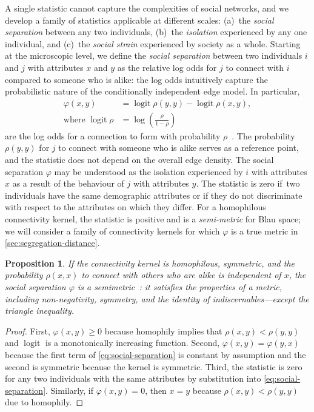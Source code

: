 \documentclass{scrartcl}
\DeclareMathOperator{\logit}{logit}
\newtheorem{prop}{Proposition}
\begin{document}
\begin{refsection}
A single statistic cannot capture the complexities of social networks, and we develop a family of statistics applicable at different scales: (a)~the \emph{social separation} between any two individuals, (b)~the \emph{isolation} experienced by any one individual, and (c)~the \emph{social strain} experienced by society as a whole. Starting at the microscopic level, we define the \emph{social separation} between two individuals $i$ and $j$ with attributes $x$ and $y$ as the relative log odds for $j$ to connect with $i$ compared to someone who is alike: the log odds intuitively capture the probabilistic nature of the conditionally independent edge model. In particular,
\begin{align}
    \varphi(x, y) &= \logit \rho(y,y) - \logit\rho(x,y),\label{eq:social-separation}\\
    \text{where }\logit\rho &= \log\left(\frac{\rho}{1-\rho}\right)\nonumber
\end{align}
are the log odds for a connection to form with probability $\rho$~\cite{Hastie2009}. The probability $\rho(y, y)$ for $j$ to connect with someone who is alike serves as a reference point, and the statistic does not depend on the overall edge density. The social separation $\varphi$ may be understood as the isolation experienced by $i$ with attributes $x$ as a result of the behaviour of $j$ with attributes $y$. The statistic is zero if two individuals have the same demographic attributes or if they do not discriminate with respect to the attributes on which they differ. For a homophilous connectivity kernel, the statistic is positive and is a \emph{semi-metric} for Blau space; we will consider a family of connectivity kernels for which $\varphi$ is a true metric in \cref{sec:segregation-distance}.

\begin{prop}\label{prop:segregations-semi-metric}
    If the connectivity kernel is homophilous, symmetric, and the probability $\rho(x,x)$ to connect with others who are alike is independent of $x$, the social separation $\varphi$ is a \emph{semimetric}~\cite{Wilson1931}: it satisfies the properties of a metric, including non-negativity, symmetry, and the identity of indiscernables---except the triangle inequality.
\end{prop}
\begin{proof}
    First, $\varphi(x,y)\geq0$ because homophily implies that $\rho(x, y)<\rho(y, y)$ and $\logit$ is a monotonically increasing function. Second, $\varphi(x,y)=\varphi(y,x)$ because the first term of \cref{eq:social-separation} is constant by assumption and the second is symmetric because the kernel is symmetric. Third, the statistic is zero for any two individuals with the same attributes by substitution into \cref{eq:social-separation}. Similarly, if $\varphi(x,y)=0$, then $x=y$ because $\rho(x, y)<\rho(y, y)$ due to homophily.
\end{proof}


\end{refsection}
\end{document}
